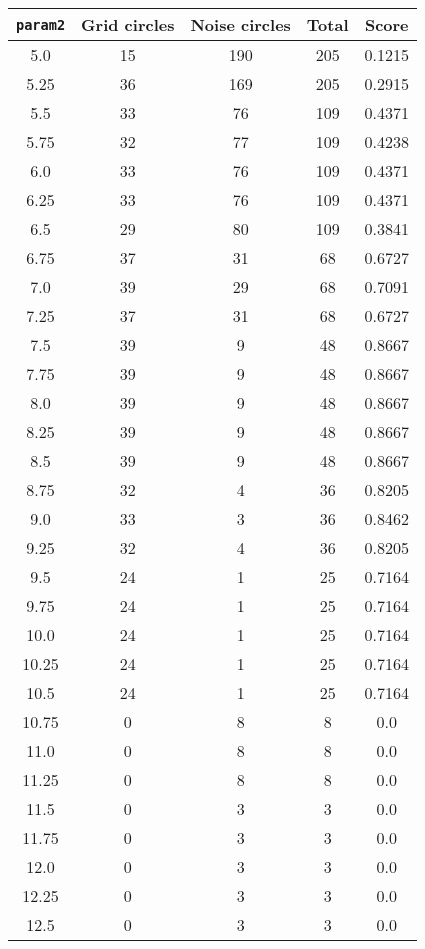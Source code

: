 \documentclass[letterpaper, 12pt]{article}
\begin{document}
\begin{longtable}{|c|c|c|c|c|}
\hline
\textbf{\texttt{param2}} & \textbf{Grid circles} & \textbf{Noise circles} & \textbf{Total} & \textbf{Score} \\
\hline
5.0 & 15 & 190 & 205 & 0.1215 \\
\hline
5.25 & 36 & 169 & 205 & 0.2915 \\
\hline
5.5 & 33 & 76 & 109 & 0.4371 \\
\hline
5.75 & 32 & 77 & 109 & 0.4238 \\
\hline
6.0 & 33 & 76 & 109 & 0.4371 \\
\hline
6.25 & 33 & 76 & 109 & 0.4371 \\
\hline
6.5 & 29 & 80 & 109 & 0.3841 \\
\hline
6.75 & 37 & 31 & 68 & 0.6727 \\
\hline
7.0 & 39 & 29 & 68 & 0.7091 \\
\hline
7.25 & 37 & 31 & 68 & 0.6727 \\
\hline
7.5 & 39 & 9 & 48 & 0.8667 \\
\hline
7.75 & 39 & 9 & 48 & 0.8667 \\
\hline
8.0 & 39 & 9 & 48 & 0.8667 \\
\hline
8.25 & 39 & 9 & 48 & 0.8667 \\
\hline
8.5 & 39 & 9 & 48 & 0.8667 \\
\hline
8.75 & 32 & 4 & 36 & 0.8205 \\
\hline
9.0 & 33 & 3 & 36 & 0.8462 \\
\hline
9.25 & 32 & 4 & 36 & 0.8205 \\
\hline
9.5 & 24 & 1 & 25 & 0.7164 \\
\hline
9.75 & 24 & 1 & 25 & 0.7164 \\
\hline
10.0 & 24 & 1 & 25 & 0.7164 \\
\hline
10.25 & 24 & 1 & 25 & 0.7164 \\
\hline
10.5 & 24 & 1 & 25 & 0.7164 \\
\hline
10.75 & 0 & 8 & 8 & 0.0 \\
\hline
11.0 & 0 & 8 & 8 & 0.0 \\
\hline
11.25 & 0 & 8 & 8 & 0.0 \\
\hline
11.5 & 0 & 3 & 3 & 0.0 \\
\hline
11.75 & 0 & 3 & 3 & 0.0 \\
\hline
12.0 & 0 & 3 & 3 & 0.0 \\
\hline
12.25 & 0 & 3 & 3 & 0.0 \\
\hline
12.5 & 0 & 3 & 3 & 0.0 \\

\end{longtable}
\end{document}
